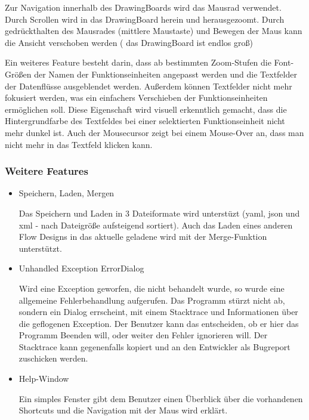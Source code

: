 	Zur Navigation innerhalb des DrawingBoards wird das Mausrad verwendet.
	Durch Scrollen wird in das DrawingBoard herein und herausgezoomt.
	Durch gedrückthalten des Mausrades (mittlere Maustaste) und Bewegen der
	Maus kann die Ansicht verschoben werden ( das DrawingBoard ist endlos groß)
	
	Ein weiteres Feature besteht darin, dass ab bestimmten Zoom-Stufen die
	Font-Größen der Namen der Funktionseinheiten angepasst werden und die 
	Textfelder der Datenflüsse ausgeblendet werden.
	Außerdem können Textfelder nicht mehr fokusiert werden, was ein einfachers
	Verschieben der Funktionseinheiten ermöglichen soll. Diese Eigenschaft wird
	visuell erkenntlich gemacht, dass die Hintergrundfarbe des Textfeldes bei
	einer selektierten Funktionseinheit nicht mehr dunkel ist.
	Auch der Mousecursor zeigt bei einem Mouse-Over an, dass man nicht mehr in
	das Textfeld klicken kann.
	
	
	\subsubsection{Weitere Features}

	\begin{itemize}
		\item Speichern, Laden, Mergen
		
		Das Speichern und Laden in 3 Dateiformate wird unterstüzt
		(yaml, json und xml - nach Dateigröße aufsteigend sortiert).
		Auch das Laden eines anderen Flow Designs in das aktuelle geladene wird 
		mit der Merge-Funktion unterstützt.

		\item Unhandled Exception ErrorDialog
		
		Wird eine Exception geworfen, die nicht behandelt wurde, so wurde eine
		allgemeine Fehlerbehandlung aufgerufen. Das Programm stürzt nicht ab,
		sondern ein Dialog errscheint, mit einem Stacktrace und Informationen
		über die geflogenen Exception. Der Benutzer kann das entscheiden, ob er
		hier das Programm Beenden will, oder weiter den Fehler ignorieren will.
		Der Stacktrace kann gegenenfalls kopiert und an den Entwickler als
		Bugreport zuschicken werden.
		
		\item Help-Window
		
		Ein simples Fenster gibt dem Benutzer einen Überblick über die
		vorhandenen Shortcuts und die Navigation mit der Maus wird erklärt.
	\end{itemize}
	




